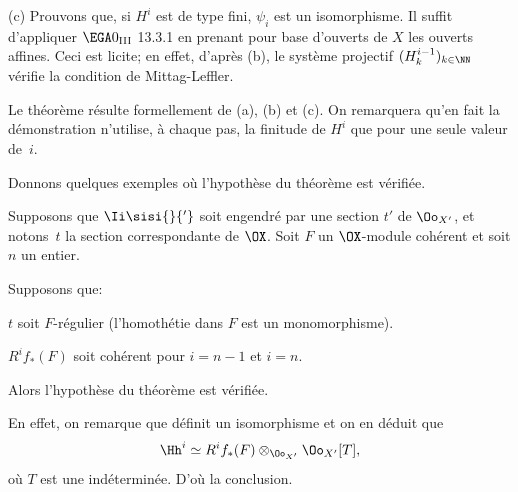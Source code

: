 \indent\textup{(c)} Prouvons que, si $H^i$ est de type fini, $\psi_i$ est un isomorphisme. Il suffit d'appliquer $\EGA 0_{\textup{III}}$ 13.3.1 en prenant pour base d'ouverts de $X$ les ouverts affines. Ceci est licite; en effet, d'apr\`es (b), le syst\`eme projectif $(H_k^{i-1})_{k\in \NN}$ v\'erifie la condition de Mittag-Leffler.

Le th\'eor\`eme r\'esulte formellement de (a), (b) et (c). On remarquera qu'en fait la d\'emonstration n'utilise, \`a chaque pas, la finitude de $H^i$ que pour une seule valeur de~$i$.

Donnons quelques exemples o\`u l'hypoth\`ese du th\'eor\`eme  est v\'erifi\'ee.

\begin{corollaire}\setcounter {equation}{28} \label{IX.1.2}
Supposons que $\Ii\sisi{}{'}$ soit engendr\'e par une section $t'$ de $\Oo_{X'}$, et notons~$t$ la section correspondante de $\OX$. Soit $F$ un $\OX$-module coh\'erent et soit $n$ un entier.

Supposons que:
\begin{enumeratei}
\item
$t$ soit $F$-r\'egulier (\ie l'homoth\'etie  dans $F$ est un monomorphisme).
\item
$R^if_*(F)$ soit coh\'erent pour $i=n-1$ et $i=n$.
\end{enumeratei}
Alors l'hypoth\`ese du th\'eor\`eme  est v\'erifi\'ee.
\end{corollaire}

En effet, on remarque que  d\'efinit un isomorphisme  et on en d\'eduit que
\begin{equation} \label{eq:IX.1.29}
\Hh^i \simeq R^if_*(F)\otimes_{\Oo_{X'}}\Oo_{X'}[T],
\end{equation}
o\`u $T$ est une ind\'etermin\'ee. D'o\`u la conclusion.

